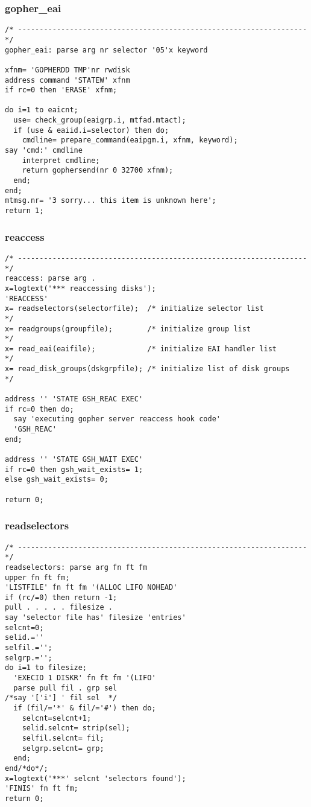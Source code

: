 \subsubsection{gopher\_eai}

\def\LPtopF{gopher\_eai}

\begin{verbatim}
/* ------------------------------------------------------------------- */
gopher_eai: parse arg nr selector '05'x keyword

xfnm= 'GOPHERDD TMP'nr rwdisk
address command 'STATEW' xfnm
if rc=0 then 'ERASE' xfnm;

do i=1 to eaicnt;
  use= check_group(eaigrp.i, mtfad.mtact);
  if (use & eaiid.i=selector) then do;
    cmdline= prepare_command(eaipgm.i, xfnm, keyword);
say 'cmd:' cmdline
    interpret cmdline;
    return gophersend(nr 0 32700 xfnm);
  end;
end;
mtmsg.nr= '3 sorry... this item is unknown here';
return 1; 
\end{verbatim}

\subsubsection{reaccess}

\def\LPtopF{reaccess}

\begin{verbatim}
/* ------------------------------------------------------------------- */
reaccess: parse arg .
x=logtext('*** reaccessing disks');
'REACCESS'
x= readselectors(selectorfile);  /* initialize selector list           */
x= readgroups(groupfile);        /* initialize group list              */
x= read_eai(eaifile);            /* initialize EAI handler list        */
x= read_disk_groups(dskgrpfile); /* initialize list of disk groups     */

address '' 'STATE GSH_REAC EXEC'
if rc=0 then do;
  say 'executing gopher server reaccess hook code'
  'GSH_REAC'
end;

address '' 'STATE GSH_WAIT EXEC'
if rc=0 then gsh_wait_exists= 1;
else gsh_wait_exists= 0;

return 0; 
\end{verbatim}

\subsubsection{readselectors}

\def\LPtopF{readselectors}

\begin{verbatim}
/* ------------------------------------------------------------------- */
readselectors: parse arg fn ft fm
upper fn ft fm;
'LISTFILE' fn ft fm '(ALLOC LIFO NOHEAD'
if (rc/=0) then return -1;
pull . . . . . filesize .
say 'selector file has' filesize 'entries'
selcnt=0;
selid.=''
selfil.='';
selgrp.='';
do i=1 to filesize;
  'EXECIO 1 DISKR' fn ft fm '(LIFO'
  parse pull fil . grp sel
/*say '['i'] ' fil sel  */
  if (fil/='*' & fil/='#') then do;
    selcnt=selcnt+1;
    selid.selcnt= strip(sel);
    selfil.selcnt= fil;
    selgrp.selcnt= grp;
  end;
end/*do*/;
x=logtext('***' selcnt 'selectors found');
'FINIS' fn ft fm;
return 0; 
\end{verbatim}

